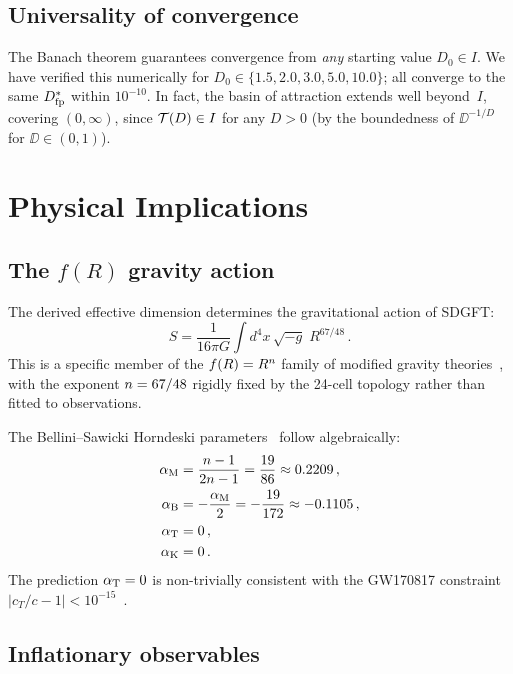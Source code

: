 \documentclass[amsmath,amssymb,aps,prd,twocolumn,superscriptaddress,nofootinbib]{revtex4-2}
\begin{document}
\subsection{Universality of convergence}

The Banach theorem guarantees convergence from \emph{any} starting
value $D_0 \in I$.  We have verified this numerically for
$D_0 \in \{1.5, 2.0, 3.0, 5.0, 10.0\}$; all converge to the same
$D^{*}_{\mathrm{fp}}$ within $10^{-10}$.  In fact, the basin of attraction
extends well beyond~$I$, covering $(0, \infty)$, since
$\mathcal{T}(D) \in I$ for any $D > 0$ (by the boundedness of
$\DD^{-1/D}$ for $\DD \in (0,1)$).

\section{Physical Implications}
\label{sec:implications}

\subsection{The $f(R)$ gravity action}

The derived effective dimension determines the gravitational
action of SDGFT:
\begin{equation}
  S = \frac{1}{16\pi G} \int d^4x\,\sqrt{-g}\;R^{67/48}\,.
  \label{eq:fR_action}
\end{equation}
This is a specific member of the $f(R) = R^n$ family of
modified gravity theories~\cite{Sotiriou2010}, with the exponent
$n = 67/48$ rigidly fixed by the 24-cell topology rather than
fitted to observations.

The Bellini--Sawicki Horndeski
parameters~\cite{Bellini2014,Goldstein_Paper14} follow
algebraically:
\begin{align}
  \alpha_{\mathrm{M}} &= \frac{n - 1}{2n - 1}
       = \frac{19}{86} \approx 0.2209\,,
       \label{eq:alpha_M} \\
  \alpha_{\mathrm{B}} &= -\frac{\alpha_{\mathrm{M}}}{2}
       = -\frac{19}{172} \approx -0.1105\,,
       \label{eq:alpha_B} \\
  \alpha_{\mathrm{T}} &= 0\,,
       \label{eq:alpha_T} \\
  \alpha_{\mathrm{K}} &= 0\,.
       \label{eq:alpha_K}
\end{align}
The prediction $\alpha_{\mathrm{T}} = 0$ is non-trivially consistent with the
GW170817 constraint
$\lvert c_T/c - 1\rvert < 10^{-15}$~\cite{GW170817_speed}.

\subsection{Inflationary observables}
\end{document}
